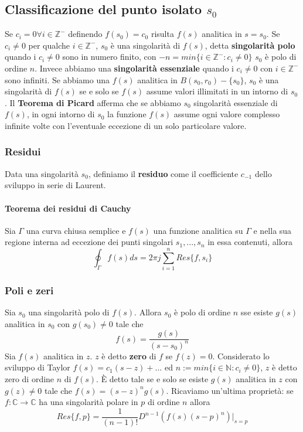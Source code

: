 \documentclass[11pt]{article}
\begin{document}
\subsection{Classificazione del punto isolato $s_0$}
Se $c_i =0 \forall i \in \mathbb{Z}^-$ definendo $f(s_0) = c_0$ risulta $f(s)$ analitica in $s=s_0$. Se $c_i \neq 0$ per qualche $i \in \mathbb{Z}^-$, $s_0$ è una singolarità di $f(s)$, detta \textbf{singolarità polo} quando i $c_i \neq 0$ sono in numero finito, con $-n = min\{i\in \mathbb{Z}^-: c_i \neq 0\}$ $s_0$ è polo di ordine $n$. Invece abbiamo una \textbf{singolarità essenziale} quando i $c_i \neq 0$ con $i \in \mathbb{Z}^-$ sono infiniti. Se abbiamo una $f(s)$ analitica in $B(s_0, r_0) - \{s_0\}$, $s_0$ è una singolarità di $f(s)$ se e solo se $f(s)$ assume valori illimitati in un intorno di $s_0$.
Il \textbf{Teorema di Picard} afferma che se abbiamo $s_0$ singolarità essenziale di $f(s)$, in ogni intorno di $s_0$ la funzione $f(s)$ assume ogni valore complesso infinite volte con l'eventuale eccezione di un solo particolare valore.
\subsubsection{Residui}
Data una singolarità $s_0$, definiamo il \textbf{residuo} come il coefficiente $c_{-1}$ dello sviluppo in serie di Laurent.
\paragraph{Teorema dei residui di Cauchy}
Sia $\Gamma$ una curva chiusa semplice e $f(s)$ una funzione analitica su $\Gamma$ e nella sua regione interna ad eccezione dei punti singolari $s_1,...,s_n$ in essa contenuti, allora
\begin{displaymath}
    \oint_\Gamma f(s) ds = 2\pi j \sum_{i=1}^n Res\{f, s_i\}
\end{displaymath}
\subsubsection{Poli e zeri}
Sia $s_0$ una singolarità polo di $f(s)$. Allora $s_0$ è polo di ordine $n$ sse esiste $g(s)$ analitica in $s_0$ con $g(s_0) \neq 0$ tale che
\begin{displaymath}
    f(s) = \frac{g(s)}{(s-s_0)^n}
\end{displaymath}
Sia $f(s)$ analitica in $z$. $z$ è detto \textbf{zero} di $f$ se $f(z)=0$. Considerato lo sviluppo di Taylor $f(s)= c_1(s-z)+\dots$ ed $n:=min\{i \in \mathbb{N}: c_i \neq 0\}$, $z$ è detto zero di ordine $n$ di $f(s)$. È detto tale se e solo se esiste $g(s)$ analitica in $z$ con $g(z) \neq 0$ tale che $f(s) = (s-z)^n g(s)$. Ricaviamo un'ultima proprietà: se $f: \mathbb{C} \rightarrow \mathbb{C}$ ha una singolarità polare in $p$ di ordine $n$ allora
\begin{displaymath}
    Res\{f,p\} = \frac{1}{(n-1)!} D^{n-1} \left(f(s)(s-p)^n\right)|_{s=p}
\end{displaymath}
\end{document}
